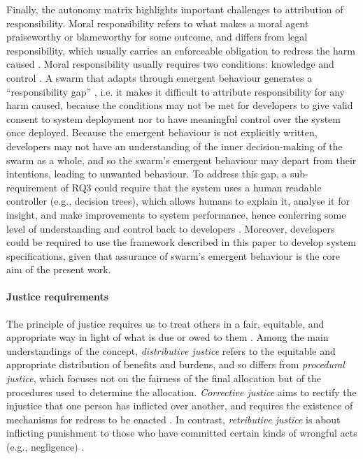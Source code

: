\documentclass[lettersize,journal]{IEEEtran}
\begin{document}
Finally, the autonomy matrix highlights important challenges to attribution of responsibility. Moral responsibility refers to what makes a moral agent praiseworthy or blameworthy for some outcome, and differs from legal responsibility, which usually carries an enforceable obligation to redress the harm caused \cite{burton2020mind}. Moral responsibility usually requires two conditions: knowledge and control \cite{santoni2021four}. A swarm that adapts through emergent behaviour generates a “responsibility gap” \cite{matthias2004responsibility}, i.e. it makes it difficult to attribute responsibility for any harm caused, because the conditions may not be met for developers to give valid consent to system deployment nor to have meaningful control over the system once deployed. Because the emergent behaviour is not explicitly written, developers may not have an understanding of the inner decision-making of the swarm as a whole, and so the swarm’s emergent behaviour may depart from their intentions, leading to unwanted behaviour. To address this gap, a sub-requirement of RQ3 could require that the system uses a human readable controller (e.g., decision trees), which allows humans to explain it, analyse it for insight, and make improvements to system performance, hence conferring some level of understanding and control back to developers \cite{jones2019onboard}. Moreover, developers could be required to use the framework described in this paper to develop system specifications, given that assurance of swarm’s emergent behaviour is the core aim of the present work. 
\\
\paragraph{Justice requirements}
The principle of justice requires us to treat others in a fair, equitable, and appropriate way in light of what is due or owed to them \cite{beauchamp2019principles}. Among the main understandings of the concept, \textit{distributive justice} refers to the equitable and appropriate distribution of benefits and burdens, and so differs from \textit{procedural justice}, which focuses not on the fairness of the final allocation but of the procedures used to determine the allocation. \textit{Corrective justice} aims to rectify the injustice that one person has inflicted over another, and requires the existence of mechanisms for redress to be enacted \cite{sep-justice}. In contrast, \textit{retributive justice} is about inflicting punishment to those who have committed certain kinds of wrongful acts (e.g., negligence) \cite{sep-justice-retributive}. 
\end{document}
